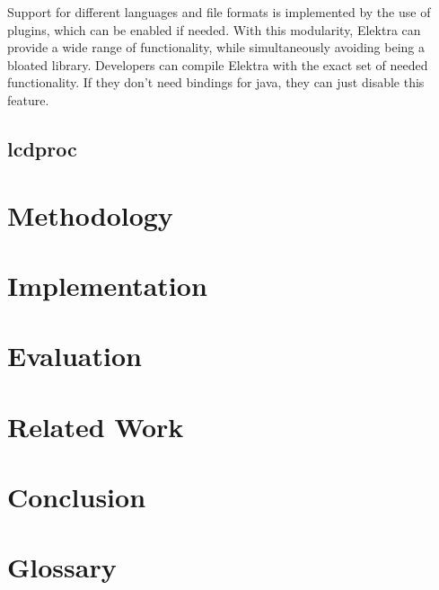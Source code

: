 \documentclass[12pt]{report}
\begin{document}
Support for different languages and file formats is implemented by the use of plugins, which can be enabled if needed.
With this modularity, Elektra can provide a wide range of functionality, while simultaneously avoiding being a bloated library.
Developers can compile Elektra with the exact set of needed functionality. If they don't need bindings for java, they can just disable this feature.

\section{lcdproc}



\chapter*{Methodology}

\chapter*{Implementation}

\chapter*{Evaluation}

\chapter*{Related Work}

\chapter*{Conclusion}

\chapter*{Glossary}

\printglossary[type=\acronymtype]

{}

\end{document}
